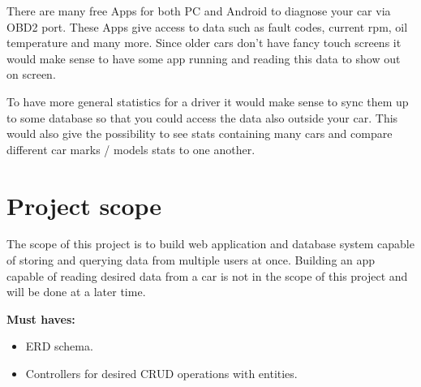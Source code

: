 There are many free Apps for both PC and Android to diagnose your car via OBD2 port.
These Apps give access to data such as fault codes, current rpm, oil temperature and many more.
Since older cars don't have fancy touch screens it would make sense to have some app running and reading this data to show out on screen.

To have more general statistics for a driver it would make sense to sync them up to some database so that you could access the data also outside your car.
This would also give the possibility to see stats containing many cars and compare different car marks / models stats to one another.


\section{Project scope}\label{sec:project-scope}
The scope of this project is to build web application and database system capable of storing and querying data from multiple users at once.
Building an app capable of reading desired data from a car is not in the scope of this project and will be done at a later time.

\textbf{Must haves:}
\begin{itemize}
    \item ERD schema.
    \item Controllers for desired CRUD operations with entities.
\end{itemize}